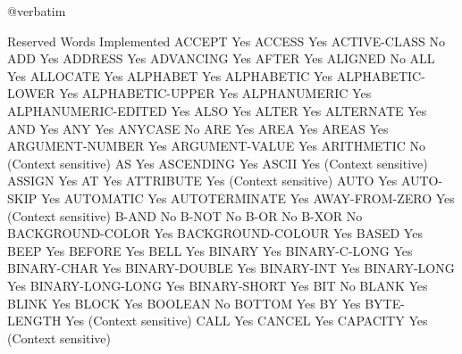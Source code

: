 @verbatim

Reserved Words                  Implemented
ACCEPT                          Yes
ACCESS                          Yes
ACTIVE-CLASS                    No
ADD                             Yes
ADDRESS                         Yes
ADVANCING                       Yes
AFTER                           Yes
ALIGNED                         No
ALL                             Yes
ALLOCATE                        Yes
ALPHABET                        Yes
ALPHABETIC                      Yes
ALPHABETIC-LOWER                Yes
ALPHABETIC-UPPER                Yes
ALPHANUMERIC                    Yes
ALPHANUMERIC-EDITED             Yes
ALSO                            Yes
ALTER                           Yes
ALTERNATE                       Yes
AND                             Yes
ANY                             Yes
ANYCASE                         No
ARE                             Yes
AREA                            Yes
AREAS                           Yes
ARGUMENT-NUMBER                 Yes
ARGUMENT-VALUE                  Yes
ARITHMETIC                      No (Context sensitive)
AS                              Yes
ASCENDING                       Yes
ASCII                           Yes (Context sensitive)
ASSIGN                          Yes
AT                              Yes
ATTRIBUTE                       Yes (Context sensitive)
AUTO                            Yes
AUTO-SKIP                       Yes
AUTOMATIC                       Yes
AUTOTERMINATE                   Yes
AWAY-FROM-ZERO                  Yes (Context sensitive)
B-AND                           No
B-NOT                           No
B-OR                            No
B-XOR                           No
BACKGROUND-COLOR                Yes
BACKGROUND-COLOUR               Yes
BASED                           Yes
BEEP                            Yes
BEFORE                          Yes
BELL                            Yes
BINARY                          Yes
BINARY-C-LONG                   Yes
BINARY-CHAR                     Yes
BINARY-DOUBLE                   Yes
BINARY-INT                      Yes
BINARY-LONG                     Yes
BINARY-LONG-LONG                Yes
BINARY-SHORT                    Yes
BIT                             No
BLANK                           Yes
BLINK                           Yes
BLOCK                           Yes
BOOLEAN                         No
BOTTOM                          Yes
BY                              Yes
BYTE-LENGTH                     Yes (Context sensitive)
CALL                            Yes
CANCEL                          Yes
CAPACITY                        Yes (Context sensitive)

